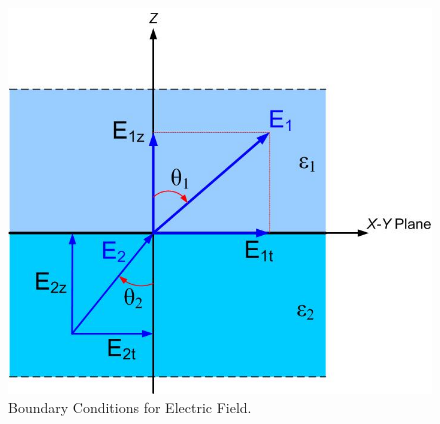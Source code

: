 \documentclass{ximera}
\begin{document}
\begin{figure}[htbp]
\begin{center}
\includegraphics[scale=0.4]{../jpg/boundaryconditions.jpg}
\end{center}
\caption{Boundary Conditions for Electric Field.}
\label{fig:BoundaryCondition}
\end{figure}








\end{document}
